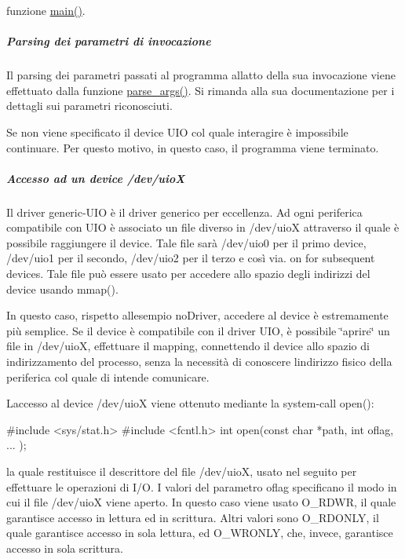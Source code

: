funzione \hyperlink{uio-int_8c_a3c04138a5bfe5d72780bb7e82a18e627}{main()}. 

\subparagraph*{Parsing dei parametri di invocazione}

Il parsing dei parametri passati al programma all\textquotesingle{}atto della sua invocazione viene effettuato dalla funzione \hyperlink{uio-int_8c_ab6b18eb1bf7bc996599c06dc6dad8f53}{parse\+\_\+args()}. Si rimanda alla sua documentazione per i dettagli sui parametri riconosciuti.

Se non viene specificato il device U\+IO col quale interagire è impossibile continuare. Per questo motivo, in questo caso, il programma viene terminato.

\subparagraph*{Accesso ad un device /dev/uioX}

Il driver generic-\/\+U\+IO è il driver generico per eccellenza. Ad ogni periferica compatibile con U\+IO è associato un file diverso in /dev/uioX attraverso il quale è possibile raggiungere il device. Tale file sarà /dev/uio0 per il primo device, /dev/uio1 per il secondo, /dev/uio2 per il terzo e così via. on for subsequent devices. Tale file può essere usato per accedere allo spazio degli indirizzi del device usando mmap().

In questo caso, rispetto all\textquotesingle{}esempio no\+Driver, accedere al device è estremamente più semplice. Se il device è compatibile con il driver U\+IO, è possibile \char`\"{}aprire\char`\"{} un file in /dev/uioX, effettuare il mapping, connettendo il device allo spazio di indirizzamento del processo, senza la necessità di conoscere l\textquotesingle{}indirizzo fisico della periferica col quale di intende comunicare.

L\textquotesingle{}accesso al device /dev/uioX viene ottenuto mediante la system-\/call open()\+: 
\begin{DoxyCode}
\textcolor{preprocessor}{#include <sys/stat.h>}
\textcolor{preprocessor}{#include <fcntl.h>}
\textcolor{keywordtype}{int} open(\textcolor{keyword}{const} \textcolor{keywordtype}{char} *path, \textcolor{keywordtype}{int} oflag, ...  );
\end{DoxyCode}
 la quale restituisce il descrittore del file /dev/uioX, usato nel seguito per effettuare le operazioni di I/O. I valori del parametro oflag specificano il modo in cui il file /dev/uioX viene aperto. In questo caso viene usato O\+\_\+\+R\+D\+WR, il quale garantisce accesso in lettura ed in scrittura. Altri valori sono O\+\_\+\+R\+D\+O\+N\+LY, il quale garantisce accesso in sola lettura, ed O\+\_\+\+W\+R\+O\+N\+LY, che, invece, garantisce accesso in sola scrittura.

